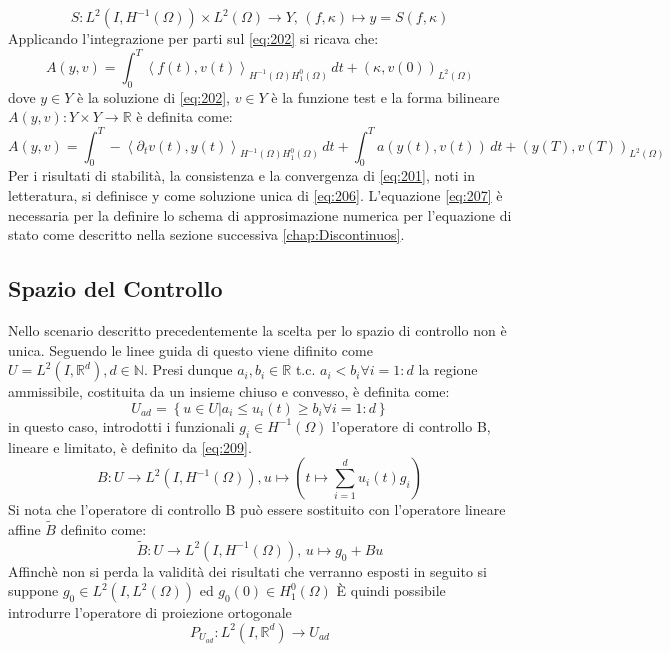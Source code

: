 \begin{equation}
S : L^2(I,{H^{-1}(\Omega)}) \times {L^{2}(\Omega)} \rightarrow Y \text{, } (f,\kappa) \longmapsto y = S(f,\kappa)
\label{eq:S}
\end{equation}
Applicando l'integrazione per parti sul \ref{eq:202} si ricava che:
\begin{equation}
A(y,v) = \int_{0}^{T} \left \langle f(t),v(t) \right \rangle_{{H^{-1}(\Omega)}{H^{0}_{1}(\Omega)}} \, dt + ({\kappa},v(0))_{L^{2}(\Omega)}
\label{eq:206}
\end{equation}
dove $y{\in}Y$ è la soluzione di \ref{eq:202}, $v{\in}Y$ è la funzione test e la forma bilineare $A(y,v): Y{\times}Y\rightarrow\mathbb{R}$ è definita come:
\begin{equation}
 A(y,v) = \int_{0}^{T} -\left \langle {\partial_{t}}v(t),y(t) \right \rangle_{{H^{-1}(\Omega)}{H^{0}_{1}(\Omega)}} \, dt + \int_{0}^{T} a(y(t),v(t)) \, dt + (y(T),v(T))_{L^{2}(\Omega)}
\label{eq:207}
\end{equation}
Per i risultati di stabilità, la consistenza e la convergenza di \eqref{eq:201}, noti in letteratura, si definisce y come soluzione unica di \eqref{eq:206}. L'equazione \eqref{eq:207} è necessaria per la definire  lo schema di approsimazione numerica per l'equazione di stato come descritto nella sezione successiva \ref{chap:Discontinuos}.

\subsection{Spazio del Controllo}
Nello scenario descritto precedentemente la scelta per lo spazio di controllo non è unica. Seguendo le linee guida di \cite{MAIN} questo viene difinito come $U = L^2(I,\mathbb{R}^d), d \in \mathbb{N}$. Presi dunque $a_i, b_i \in \mathbb{R}$ t.c. $a_i<b_i {\forall}i=1:d$ la regione ammissibile, costituita da un insieme chiuso e convesso, è definita come:
\begin{equation}
U_{ad} = \left\{ u \in U | a_i \leq u_i(t) \geq b_i {\forall}i=1:d  \right\}
\label{eq:208}
\end{equation}
in questo caso, introdotti i funzionali $g_i \in {H^{-1}(\Omega)}$ l'operatore di controllo B, lineare e limitato, è definito da \ref{eq:209}.
\begin{equation}
B : U \rightarrow L^2(I,{H^{-1}(\Omega)}), u\mapsto \left( t\mapsto\sum_{i=1}^d u_i(t)g_i \right)
\label{eq:209}
\end{equation}
Si nota che l'operatore di controllo B può essere sostituito con l'operatore lineare affine $\tilde{B}$ definito come:
\begin{equation}
\tilde{B} : U \rightarrow L^2(I,{H^{-1}(\Omega)}) \text{, } u\mapsto g_0 + Bu
\label{eq:210}
\end{equation}
Affinchè non si perda la validità dei risultati che verranno esposti in seguito si suppone $g_0 \in L^2(I,{L^{2}(\Omega)})$ ed $g_0(0) \in {H^{0}_{1}(\Omega)}$
\MakeUppercase{è} quindi possibile introdurre l'operatore di proiezione ortogonale 
\begin{equation}
P_{U_{ad}} : L^2(I,\mathbb{R}^d)\rightarrow U_{ad}
\label{eq:211}
\end{equation}

